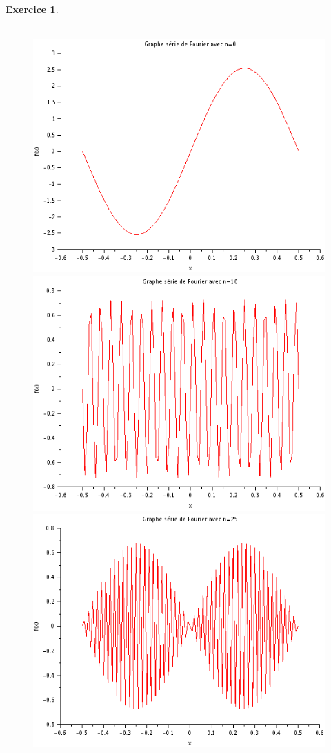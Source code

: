 \documentclass[a4paper,11pt]{article}
\newtheorem{exo}{Exercice}
\begin{document}
\newpage
\begin{exo} \ \\ \\
\begin{figure}[h]
\includegraphics[scale=0.7]{../annexes/images/fourier_0.PNG}
\includegraphics[scale=0.7]{../annexes/images/fourier_10.PNG}
\includegraphics[scale=0.7]{../annexes/images/fourier_25.PNG}

\end{figure}
\end{exo}
\end{document}
